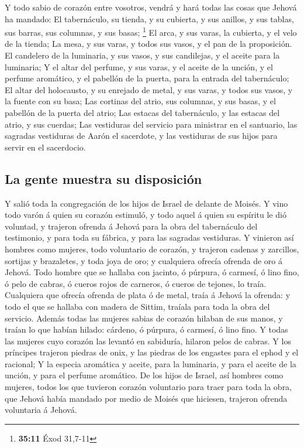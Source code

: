  Y todo sabio de corazón entre vosotros, vendrá y hará
todas las cosas que Jehová ha mandado:  El tabernáculo,
su tienda, y su cubierta, y sus anillos, y sus tablas, sus barras, sus
columnas, y sus basas; \footnote{\textbf{35:11} Éxod 31,7-11}
 El arca, y sus varas, la cubierta, y el velo de la
tienda;  La mesa, y sus varas, y todos sus vasos, y el
pan de la proposición.  El candelero de la luminaria, y
sus vasos, y sus candilejas, y el aceite para la luminaria;
 Y el altar del perfume, y sus varas, y el aceite de la
unción, y el perfume aromático, y el pabellón de la puerta, para la
entrada del tabernáculo;  El altar del holocausto, y su
enrejado de metal, y sus varas, y todos sus vasos, y la fuente con su
basa;  Las cortinas del atrio, sus columnas, y sus basas,
y el pabellón de la puerta del atrio;  Las estacas del
tabernáculo, y las estacas del atrio, y sus cuerdas;  Las
vestiduras del servicio para ministrar en el santuario, las sagradas
vestiduras de Aarón el sacerdote, y las vestiduras de sus hijos para
servir en el sacerdocio.

\hypertarget{la-gente-muestra-su-disposiciuxf3n}{%
\subsection{La gente muestra su
disposición}\label{la-gente-muestra-su-disposiciuxf3n}}

 Y salió toda la congregación de los hijos de Israel de
delante de Moisés.  Y vino todo varón á quien su corazón
estimuló, y todo aquel á quien su espíritu le dió voluntad, y trajeron
ofrenda á Jehová para la obra del tabernáculo del testimonio, y para
toda su fábrica, y para las sagradas vestiduras.  Y
vinieron así hombres como mujeres, todo voluntario de corazón, y
trajeron cadenas y zarcillos, sortijas y brazaletes, y toda joya de oro;
y cualquiera ofrecía ofrenda de oro á Jehová.  Todo
hombre que se hallaba con jacinto, ó púrpura, ó carmesí, ó lino fino, ó
pelo de cabras, ó cueros rojos de carneros, ó cueros de tejones, lo
traía.  Cualquiera que ofrecía ofrenda de plata ó de
metal, traía á Jehová la ofrenda: y todo el que se hallaba con madera de
Sittim, traíala para toda la obra del servicio.  Además
todas las mujeres sabias de corazón hilaban de sus manos, y traían lo
que habían hilado: cárdeno, ó púrpura, ó carmesí, ó lino fino.
 Y todas las mujeres cuyo corazón las levantó en
sabiduría, hilaron pelos de cabras.  Y los príncipes
trajeron piedras de onix, y las piedras de los engastes para el ephod y
el racional;  Y la especia aromática y aceite, para la
luminaria, y para el aceite de la unción, y para el perfume aromático.
 De los hijos de Israel, así hombres como mujeres, todos
los que tuvieron corazón voluntario para traer para toda la obra, que
Jehová había mandado por medio de Moisés que hiciesen, trajeron ofrenda
voluntaria á Jehová.

